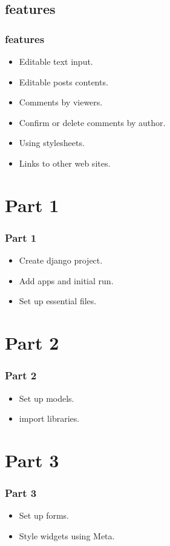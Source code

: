 \documentclass{beamer}
\begin{document}
\subsection{features}
\begin{frame}
\frametitle{features}
\begin{itemize}
\item Editable text input.
\item Editable posts contents.
\item Comments by viewers.
\item Confirm or delete comments by author.
\item Using stylesheets.
\item Links to other web sites.
\end{itemize}
\end{frame}

\section{Part 1}
\begin{frame}
\frametitle{Part 1}
\begin{itemize}
\item Create django project.
\item Add apps and initial run.
\item Set up essential files.
\end{itemize}
\end{frame}

\section{Part 2}
\begin{frame}
\frametitle{Part 2}
\begin{itemize}
\item Set up models.
\item import libraries.

\end{itemize}
\end{frame}

\section{Part 3}
\begin{frame}
\frametitle{Part 3}
\begin{itemize}
\item Set up forms.
\item Style widgets using Meta.

\end{itemize}
\end{frame}
\end{document}
